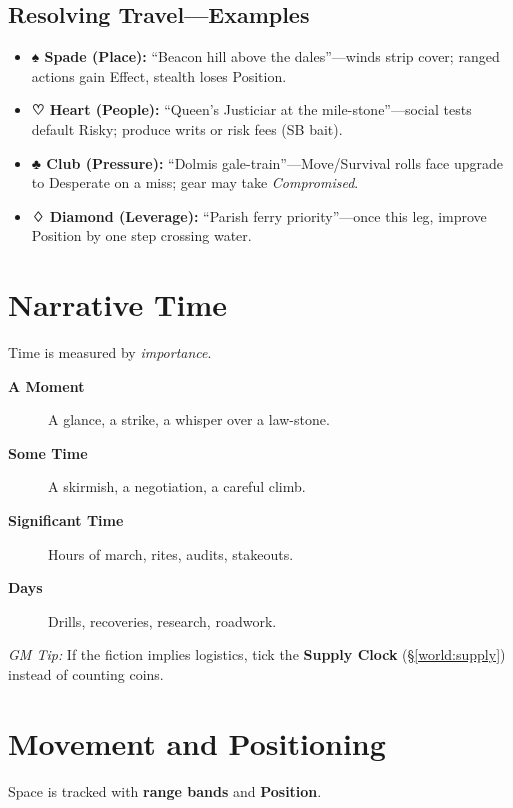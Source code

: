 \begin{multicols}{2}
\subsection*{Resolving Travel—Examples}
\begin{itemize}
  \item \textbf{♠ Spade (Place):} “Beacon hill above the dales”—winds strip cover; ranged actions gain Effect, stealth loses Position.
  \item \textbf{♡ Heart (People):} “Queen’s Justiciar at the mile-stone”—social tests default Risky; produce writs or risk fees (SB bait).
  \item \textbf{♣ Club (Pressure):} “Dolmis gale-train”—Move/Survival rolls face upgrade to Desperate on a miss; gear may take \emph{Compromised}.
  \item \textbf{♢ Diamond (Leverage):} “Parish ferry priority”—once this leg, improve Position by one step crossing water.
\end{itemize}

\section{Narrative Time}
Time is measured by \emph{importance}.
\begin{description}
  \item[\textbf{A Moment}]  A glance, a strike, a whisper over a law-stone.
  \item[\textbf{Some Time}]  A skirmish, a negotiation, a careful climb.
  \item[\textbf{Significant Time}]  Hours of march, rites, audits, stakeouts.
  \item[\textbf{Days}]  Drills, recoveries, research, roadwork.
\end{description}
\emph{GM Tip:} If the fiction implies logistics, tick the \textbf{Supply Clock} (\S\ref{world:supply}) instead of counting coins.

\section{Movement and Positioning}
Space is tracked with \textbf{range bands} and \textbf{Position}.


\end{multicols}
